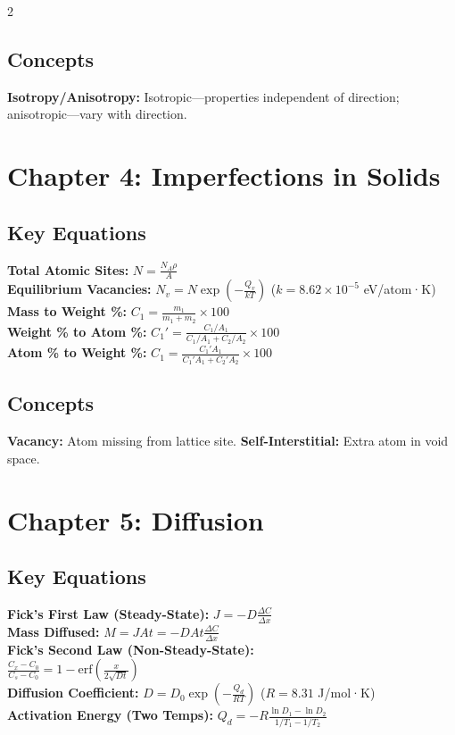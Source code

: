 \documentclass[7pt]{article}
\begin{document}
\begin{multicols*}{2}
\subsection*{Concepts}
\textbf{Isotropy/Anisotropy:} Isotropic—properties independent of direction; anisotropic—vary with direction.

\section*{Chapter 4: Imperfections in Solids}
\subsection*{Key Equations}
\textbf{Total Atomic Sites:} $N = \frac{N_A \rho}{A}$ \\
\textbf{Equilibrium Vacancies:} $N_v = N\exp\!\left(-\frac{Q_v}{kT}\right)$ \quad ($k=8.62\times10^{-5}$ eV/atom·K) \\
\textbf{Mass to Weight \%:} $C_1 = \frac{m_1}{m_1+m_2}\times100$ \\
\textbf{Weight \% to Atom \%:} $C_1' = \frac{C_1/A_1}{C_1/A_1+C_2/A_2}\times100$ \\
\textbf{Atom \% to Weight \%:} $C_1 = \frac{C_1'A_1}{C_1'A_1+C_2'A_2}\times100$
\subsection*{Concepts}
\textbf{Vacancy:} Atom missing from lattice site. \textbf{Self-Interstitial:} Extra atom in void space.

\section*{Chapter 5: Diffusion}
\subsection*{Key Equations}
\textbf{Fick's First Law (Steady-State):} $J = -D\frac{\Delta C}{\Delta x}$ \\
\textbf{Mass Diffused:} $M = JAt = -DAt\frac{\Delta C}{\Delta x}$ \\
\textbf{Fick's Second Law (Non-Steady-State):} \\
$\frac{C_x - C_0}{C_s - C_0} = 1 - \mathrm{erf}\!\left(\frac{x}{2\sqrt{Dt}}\right)$ \\
\textbf{Diffusion Coefficient:} $D = D_0\exp\!\left(-\frac{Q_d}{RT}\right)$ \quad ($R=8.31$ J/mol·K) \\
\textbf{Activation Energy (Two Temps):} $Q_d = -R\frac{\ln D_1 - \ln D_2}{1/T_1 - 1/T_2}$


\end{multicols*}
\end{document}

